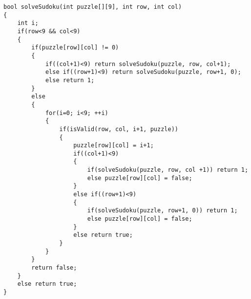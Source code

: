 \documentclass{article}
\begin{document}
\begin{verbatim}
bool solveSudoku(int puzzle[][9], int row, int col)
{
    int i;
    if(row<9 && col<9)
    {
        if(puzzle[row][col] != 0)
        {
            if((col+1)<9) return solveSudoku(puzzle, row, col+1);
            else if((row+1)<9) return solveSudoku(puzzle, row+1, 0);
            else return 1;
        }
        else
        {
            for(i=0; i<9; ++i)
            {
                if(isValid(row, col, i+1, puzzle))
                {
                    puzzle[row][col] = i+1;
                    if((col+1)<9)
                    {
                        if(solveSudoku(puzzle, row, col +1)) return 1;
                        else puzzle[row][col] = false;
                    }
                    else if((row+1)<9)
                    {
                        if(solveSudoku(puzzle, row+1, 0)) return 1;
                        else puzzle[row][col] = false;
                    }
                    else return true;
                }
            }
        }
        return false;
    }
    else return true;
}   
\end{verbatim}
\end{document}
